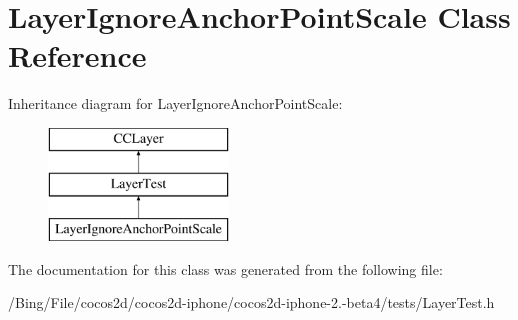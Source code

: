 \hypertarget{interface_layer_ignore_anchor_point_scale}{\section{Layer\-Ignore\-Anchor\-Point\-Scale Class Reference}
\label{interface_layer_ignore_anchor_point_scale}
}
Inheritance diagram for Layer\-Ignore\-Anchor\-Point\-Scale\-:\begin{figure}[H]
\begin{center}
\leavevmode
\includegraphics[height=3.000000cm]{interface_layer_ignore_anchor_point_scale}
\end{center}
\end{figure}


The documentation for this class was generated from the following file\-:\begin{DoxyCompactItemize}
\item 
/\-Bing/\-File/cocos2d/cocos2d-\/iphone/cocos2d-\/iphone-\/2.-\/beta4/tests/Layer\-Test.\-h\end{DoxyCompactItemize}
